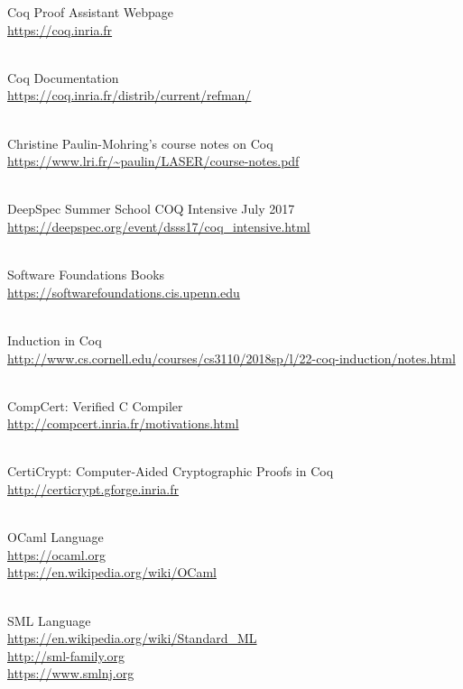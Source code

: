 
Coq Proof Assistant Webpage 		\\
\url{https://coq.inria.fr}

~\\
Coq Documentation \\
\url{https://coq.inria.fr/distrib/current/refman/}

~\\
Christine Paulin-Mohring's course notes on Coq 	\\
\url{https://www.lri.fr/~paulin/LASER/course-notes.pdf}

~\\
DeepSpec Summer School COQ Intensive July 2017	\\
\url{https://deepspec.org/event/dsss17/coq\_intensive.html}

~\\
Software Foundations Books		\\
\url{https://softwarefoundations.cis.upenn.edu}

~\\
Induction in Coq		\\
\url{http://www.cs.cornell.edu/courses/cs3110/2018sp/l/22-coq-induction/notes.html}

~\\
CompCert: Verified C Compiler		\\
\url{http://compcert.inria.fr/motivations.html}

~\\
CertiCrypt: Computer-Aided Cryptographic Proofs in Coq		\\
\url{http://certicrypt.gforge.inria.fr}

~\\
OCaml Language
\\ \url{https://ocaml.org}
\\ \url{https://en.wikipedia.org/wiki/OCaml}

~\\
SML Language
\\ \url{https://en.wikipedia.org/wiki/Standard_ML}
\\ \url{http://sml-family.org}
\\ \url{https://www.smlnj.org}
